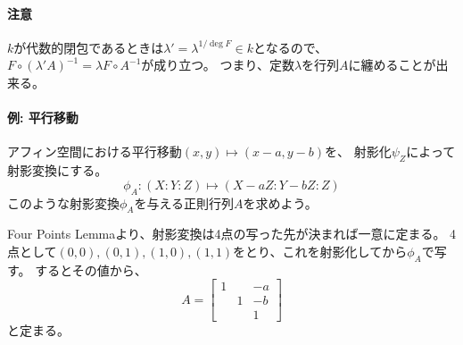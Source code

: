 \documentclass[a4]{article}
\begin{document}
    \paragraph{注意}
    $k$が代数的閉包であるときは$\lambda'=\lambda^{1/\deg F} \in k$となるので、
    $F \circ (\lambda' A)^{-1}=\lambda F \circ A^{-1}$が成り立つ。
    つまり、定数$\lambda$を行列$A$に纏めることが出来る。

    \paragraph{例: 平行移動}
    アフィン空間における平行移動$(x,y) \mapsto (x-a, y-b)$を、
    射影化$\psi_{Z}$によって射影変換にする。
    \[ \phi_{A} : (X:Y:Z) \mapsto (X-aZ:Y-bZ:Z)\]
    このような射影変換$\phi_{A}$を与える正則行列$A$を求めよう。

    Four Points Lemmaより、射影変換は4点の写った先が決まれば一意に定まる。
    4点として$(0,0),(0,1),(1,0),(1,1)$をとり、これを射影化してから$\phi_A$で写す。
    するとその値から、
    \[
        A=
        \begin{bmatrix}
            1& {}& -a \\
            {}& 1& -b \\
            {}& {}& 1
        \end{bmatrix}
    \]
    と定まる。
\end{document}
